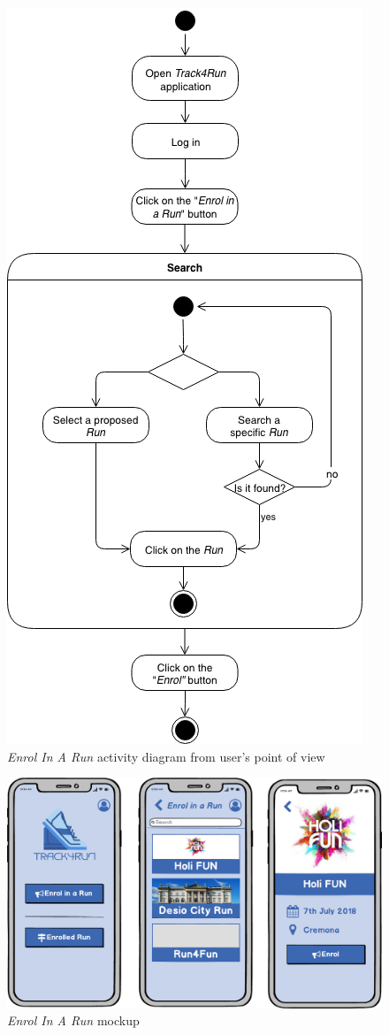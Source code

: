 \begin{figure}[H]
\begin{center}
  \includegraphics[height=0.6\paperheight]{img/activity/Enrol.png}
  \hspace{0.05\linewidth}
  \centering
  \caption{\textit{Enrol In A Run} activity diagram from user's point of view}
  \label{img:enrolInARunActivityDiagram}
\end{center}
\end{figure}

\begin{figure}[H]
\begin{center}
  \includegraphics[width=\textwidth]{img/mockup/EnrolRun.png}
  \hspace{0.05\linewidth}
  \centering
  \caption{\textit{Enrol In A Run} mockup}
  \label{img:enrolInARunMockup}
\end{center}
\end{figure}
